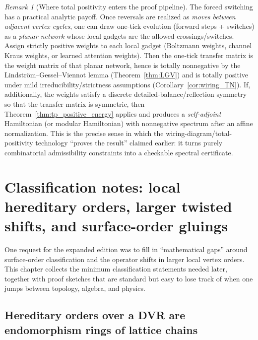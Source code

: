\documentclass[11pt,oneside]{amsbook}
\numberwithin{equation}{section}
\theoremstyle{plain}
\theoremstyle{definition}
\theoremstyle{remark}
\newtheorem{remark}[theorem]{Remark}
\begin{document}
\begin{enumerate}
\begin{remark}[Where total positivity enters the proof pipeline]
The forced switching has a practical analytic payoff.
Once reversals are realized as \emph{moves between adjacent vertex cycles}, one can draw one-tick evolution (forward steps + switches) as a \emph{planar network} whose local gadgets are the allowed crossings/switches.
Assign strictly positive weights to each local gadget (Boltzmann weights, channel Kraus weights, or learned attention weights).
Then the one-tick transfer matrix is the weight matrix of that planar network, hence is totally nonnegative by the Lindstr\"om--Gessel--Viennot lemma (Theorem~\ref{thm:LGV}) and is totally positive under mild irreducibility/strictness assumptions (Corollary~\ref{cor:wiring_TN}).
If, additionally, the weights satisfy a discrete detailed-balance/reflection symmetry so that the transfer matrix is symmetric, then
Theorem~\ref{thm:tp_positive_energy} applies and produces a \emph{self-adjoint} Hamiltonian (or modular Hamiltonian) with nonnegative spectrum after an affine normalization.
This is the precise sense in which the wiring-diagram/total-positivity technology ``proves the result'' claimed earlier: it turns purely combinatorial admissibility constraints into a checkable spectral certificate.
\end{remark}




\end{enumerate}

\section{Classification notes: local hereditary orders, larger twisted shifts, and surface-order gluings}

\label{ch:classification}


One request for the expanded edition was to fill in ``mathematical gaps'' around
surface-order classification and the operator shifts in larger local vertex orders.
This chapter collects the minimum classification statements needed later, together with proof sketches that
are standard but easy to lose track of when one jumps between topology, algebra, and physics.

\subsection{Hereditary orders over a DVR are endomorphism rings of lattice chains}
\label{sec:lattice_chains}
\end{document}
